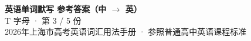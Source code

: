 \documentclass[10pt,a4paper]{article}
\begin{document}
\pagestyle{plain}

\begin{center}
{\LARGE\bfseries 英语单词默写 \quad 参考答案（中 $\to$ 英）}\\[0.22em]
{\large T 字母 · 第 3 / 5 份}\\[0.18em]
{\small 2026年上海市高考英语词汇用法手册 · 参照普通高中英语课程标准}
\end{center}

\vspace{0.2em}
\noindent{\color{rulegray}\rule{\textwidth}{0.8pt}}

\vspace{0.35em}

\vspace{0.25em}
\renewcommand{\arraystretch}{1.32}
\end{document}
